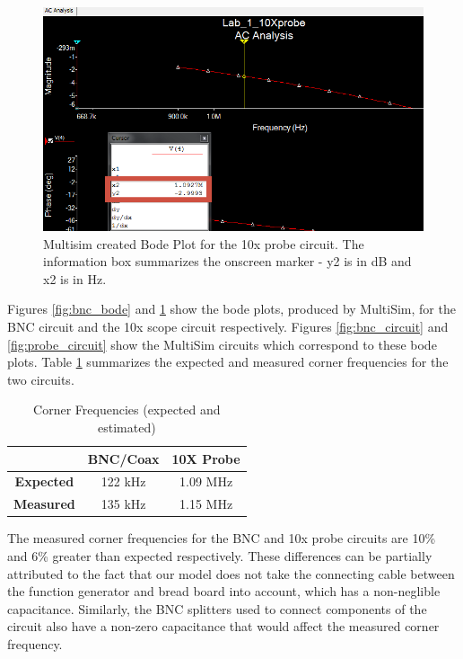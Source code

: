 \documentclass[12pt,letterpaper]{report}
\newlength \figwidth
\begin{document}
\begin{figure}
	\centering
	\includegraphics[width=\figwidth, keepaspectratio=true]{lab1_images/10x_bode.png} 
	\caption{Multisim created Bode Plot for the 10x probe circuit. The information box summarizes the onscreen marker - y2 is in dB and x2 is in Hz. }
	\label{fig:probe_bode}
\end{figure}

Figures \ref{fig:bnc_bode} and \ref{fig:probe_bode} show the bode plots, produced by MultiSim, for the BNC circuit and the 10x scope circuit respectively. Figures \ref{fig:bnc_circuit} and \ref{fig:probe_circuit} show the MultiSim circuits which correspond to these bode plots. Table \ref{table:corners} summarizes the expected and measured corner frequencies for the two circuits.

\begin{center}
\begin{table}[ht]
\caption{Corner Frequencies (expected and estimated)}
\centering 
	\begin{tabular}{| c | c | c |}
	\hline
	& \textbf{BNC/Coax} & \textbf{10X Probe} \\
	\hline
	\textbf{Expected} & 122 kHz & 1.09 MHz \\
	\textbf{Measured} & 135 kHz & 1.15 MHz \\
	\hline
	\end{tabular}
	\label{table:corners}
\end{table}
\end{center}

The measured corner frequencies for the BNC and 10x probe circuits are 10\% and 6\% greater than expected respectively. These differences can be partially attributed to the fact that our model does not take the connecting cable between the function generator and bread board into account, which has a non-neglible capacitance. Similarly, the BNC splitters used to connect components of the circuit also have a non-zero capacitance that would affect the measured corner frequency.
\end{document}
